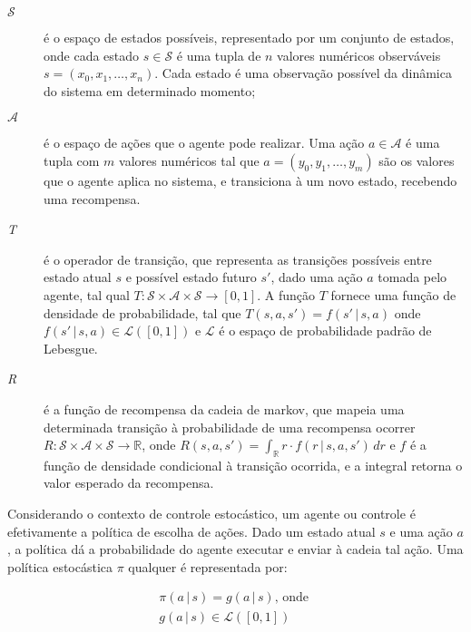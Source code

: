 \begin{description}
	\item[$\mathcal{S}$] 
	é o espaço de estados possíveis, representado por um conjunto de estados, onde cada estado $s \in \mathcal{S}$ é uma tupla de $n$ valores numéricos observáveis $s = (x_{0}, x_{1}, \ldots, x_{n})$. Cada estado é uma observação possível da dinâmica do sistema em determinado momento;
	
	\item[$\mathcal{A}$] é o espaço de ações que o agente pode realizar. Uma ação $a \in \mathcal{A}$ é uma tupla com $m$ valores numéricos tal que $a = (y_{0}, y_{1}, \ldots, y_{m})$ são os valores que o agente aplica no sistema, e transiciona à um novo estado, recebendo uma recompensa.
	
	\item[\textit{T}] é o operador de transição, que representa as transições possíveis entre estado atual $s$ e possível estado futuro $s'$, dado uma ação $a$ tomada pelo agente, tal qual \(T : \mathcal{S} \times \mathcal{A} \times \mathcal{S} \rightarrow [0, 1]\). A função $T$ fornece uma função de densidade de probabilidade, tal que $T(s, a, s') = f(s' \,|\, s, a)$ onde \(f(s' \,|\, s, a) \in \mathcal{L}([0, 1])\) e $\mathcal{L}$ é o espaço de probabilidade padrão de Lebesgue.
	
	\item[\textit{R}] é a função de recompensa da cadeia de markov, que mapeia uma determinada transição à probabilidade de uma recompensa ocorrer 
	$R : \mathcal{S} \times \mathcal{A} \times \mathcal{S} \rightarrow \mathbb{R}$, onde $R(s, a, s') = \int_{\mathbb{R}} r \cdot f(r \,|\, s, a, s') \, dr$ e $f$ é a função de densidade condicional à transição ocorrida, e a integral retorna o valor esperado da recompensa.
\end{description}

Considerando o contexto de controle estocástico, um agente ou controle é efetivamente a política de escolha de ações. Dado um estado atual $s$ e uma ação $a$, a política dá a probabilidade do agente executar e enviar à cadeia tal ação. Uma política estocástica $\pi$ qualquer é representada por:

\begin{equation}
	\begin{aligned}
	\pi(a \,|\, s) = g(a \,|\, s)\text{, onde }\\ g(a \,|\, s) \in \mathcal{L}([0, 1])
	\end{aligned}
\end{equation}

